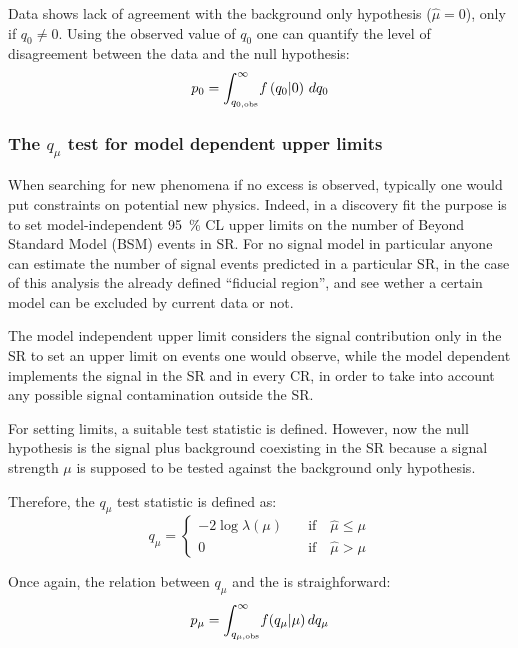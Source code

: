 Data shows lack of agreement with the background only hypothesis ($\hat{\mu}=0$), only if $q_0\ne0$. Using the observed value of $q_0$ one can quantify the level of disagreement between the data and the null hypothesis:
\begin{equation}
 p_{0}=\int_{q_{0,\textup{obs}}}^\infty\! f\left(q_0 \vert 0\right) \,dq_0
 \label{eqn:pdaq0}
\end{equation}

\subsubsection{The $q_\mu$ test for model dependent upper limits}
When searching for new phenomena if no excess is observed, typically one would put constraints on potential new physics. Indeed, in a discovery fit the purpose is to set model-independent \SI{95}{\percent} CL upper limits on the number of Beyond Standard Model (BSM) events in SR. For no signal model in particular anyone can estimate the number of signal events predicted in a particular SR, in the case of this analysis the already defined ``fiducial region'', and see wether a certain model can be excluded by current data or not.

The model independent upper limit considers the signal contribution only in the SR to set an upper limit on events one would observe, while the model dependent implements the signal in the SR and in every CR, in order to take into account any possible signal contamination outside the SR. 

For setting limits, a suitable test statistic is defined. However, now the null hypothesis is the signal plus background coexisting in the SR because a signal strength $\mu$ is supposed to be tested against the background only hypothesis.

Therefore, the $q_\mu$ test statistic is defined as:
\begin{equation}
q_\mu=
\left\{
\begin{aligned}
-2\log{\lambda(\mu)}\quad &\text{if}\quad \hat{\mu}\le\mu\\
 0 \qquad&\text{if}\quad \hat{\mu}>\mu
\end{aligned}
\right.
\end{equation} 

Once again, the relation between $q_\mu$ and the \p is straighforward:
\begin{equation}
 p_{\mu}=\int_{q_{\mu,\textup{obs}}}^\infty\! f(q_\mu \vert \mu)\, dq_\mu
 \label{eqn:pdaqmu}
\end{equation}

